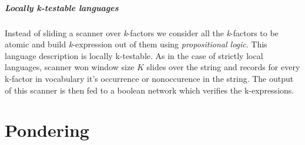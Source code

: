 \subparagraph{Locally k-testable languages} Instead of sliding a scanner over \textit{k}-factors we consider all the \textit{k}-factors to be atomic and build \textit{k}-expression out of them using \textit{propositional logic}. This language description is locally k-testable. As in the case of strictly local languages, scanner won window size $K$ slides over the string and records for every k-factor in vocabulary it's occurrence or nonoccurence in the string. The output of this scanner is then fed to a boolean network which verifies the k-expressions. 

\section{Pondering}
\cite{Graves2016}



